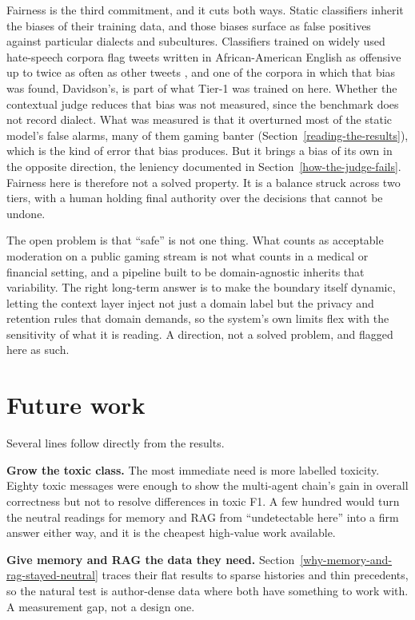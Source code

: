 Fairness is the third commitment, and it cuts both ways. Static classifiers inherit the biases of their training data, and those biases surface as false positives against particular dialects and subcultures. Classifiers trained on widely used hate-speech corpora flag tweets written in African-American English as offensive up to twice as often as other tweets \citep{sap2019risk, davidson2019racial}, and one of the corpora in which that bias was found, Davidson's, is part of what Tier-1 was trained on here. Whether the contextual judge reduces that bias was not measured, since the benchmark does not record dialect. What was measured is that it overturned most of the static model's false alarms, many of them gaming banter (Section~\ref{reading-the-results}), which is the kind of error that bias produces. But it brings a bias of its own in the opposite direction, the leniency documented in Section~\ref{how-the-judge-fails}. Fairness here is therefore not a solved property. It is a balance struck across two tiers, with a human holding final authority over the decisions that cannot be undone.

The open problem is that ``safe'' is not one thing. What counts as acceptable moderation on a public gaming stream is not what counts in a medical or financial setting, and a pipeline built to be domain-agnostic inherits that variability. The right long-term answer is to make the boundary itself dynamic, letting the context layer inject not just a domain label but the privacy and retention rules that domain demands, so the system's own limits flex with the sensitivity of what it is reading. A direction, not a solved problem, and flagged here as such.

\section{Future work}\label{future-work}

Several lines follow directly from the results.

\textbf{Grow the toxic class.} The most immediate need is more labelled toxicity. Eighty toxic messages were enough to show the multi-agent chain's gain in overall correctness but not to resolve differences in toxic F1. A few hundred would turn the neutral readings for memory and RAG from ``undetectable here'' into a firm answer either way, and it is the cheapest high-value work available.

\textbf{Give memory and RAG the data they need.} Section~\ref{why-memory-and-rag-stayed-neutral} traces their flat results to sparse histories and thin precedents, so the natural test is author-dense data where both have something to work with. A measurement gap, not a design one.

